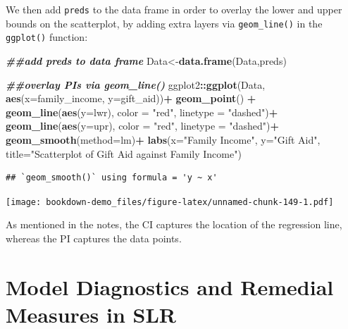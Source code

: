 \documentclass[
]{book}
\newenvironment{Shaded}{\begin{snugshade}}{\end{snugshade}}
\newcommand{\AttributeTok}[1]{\textcolor[rgb]{0.13,0.29,0.53}{#1}}
\newcommand{\DocumentationTok}[1]{\textcolor[rgb]{0.56,0.35,0.01}{\textbf{\textit{#1}}}}
\newcommand{\FunctionTok}[1]{\textcolor[rgb]{0.13,0.29,0.53}{\textbf{#1}}}
\newcommand{\NormalTok}[1]{#1}
\newcommand{\OtherTok}[1]{\textcolor[rgb]{0.56,0.35,0.01}{#1}}
\newcommand{\SpecialCharTok}[1]{\textcolor[rgb]{0.81,0.36,0.00}{\textbf{#1}}}
\newcommand{\StringTok}[1]{\textcolor[rgb]{0.31,0.60,0.02}{#1}}
\begin{document}
We then add \texttt{preds} to the data frame in order to overlay the lower and upper bounds on the scatterplot, by adding extra layers via \texttt{geom\_line()} in the \texttt{ggplot()} function:

\begin{Shaded}
\begin{Highlighting}[]
\DocumentationTok{\#\#add preds to data frame}
\NormalTok{Data}\OtherTok{\textless{}{-}}\FunctionTok{data.frame}\NormalTok{(Data,preds)}

\DocumentationTok{\#\#overlay PIs via geom\_line()}
\NormalTok{ggplot2}\SpecialCharTok{::}\FunctionTok{ggplot}\NormalTok{(Data, }\FunctionTok{aes}\NormalTok{(}\AttributeTok{x=}\NormalTok{family\_income, }\AttributeTok{y=}\NormalTok{gift\_aid))}\SpecialCharTok{+}
  \FunctionTok{geom\_point}\NormalTok{() }\SpecialCharTok{+}
  \FunctionTok{geom\_line}\NormalTok{(}\FunctionTok{aes}\NormalTok{(}\AttributeTok{y=}\NormalTok{lwr), }\AttributeTok{color =} \StringTok{"red"}\NormalTok{, }\AttributeTok{linetype =} \StringTok{"dashed"}\NormalTok{)}\SpecialCharTok{+}
  \FunctionTok{geom\_line}\NormalTok{(}\FunctionTok{aes}\NormalTok{(}\AttributeTok{y=}\NormalTok{upr), }\AttributeTok{color =} \StringTok{"red"}\NormalTok{, }\AttributeTok{linetype =} \StringTok{"dashed"}\NormalTok{)}\SpecialCharTok{+}
  \FunctionTok{geom\_smooth}\NormalTok{(}\AttributeTok{method=}\NormalTok{lm)}\SpecialCharTok{+}
  \FunctionTok{labs}\NormalTok{(}\AttributeTok{x=}\StringTok{"Family Income"}\NormalTok{, }
       \AttributeTok{y=}\StringTok{"Gift Aid"}\NormalTok{, }
       \AttributeTok{title=}\StringTok{"Scatterplot of Gift Aid against Family Income"}\NormalTok{)}
\end{Highlighting}
\end{Shaded}

\begin{verbatim}
## `geom_smooth()` using formula = 'y ~ x'
\end{verbatim}

\texttt{[image: bookdown-demo\_files/figure-latex/unnamed-chunk-149-1.pdf]}

As mentioned in the notes, the CI captures the location of the regression line, whereas the PI captures the data points.

\hypertarget{diag}{%
\chapter{Model Diagnostics and Remedial Measures in SLR}\label{diag}}
\end{document}
